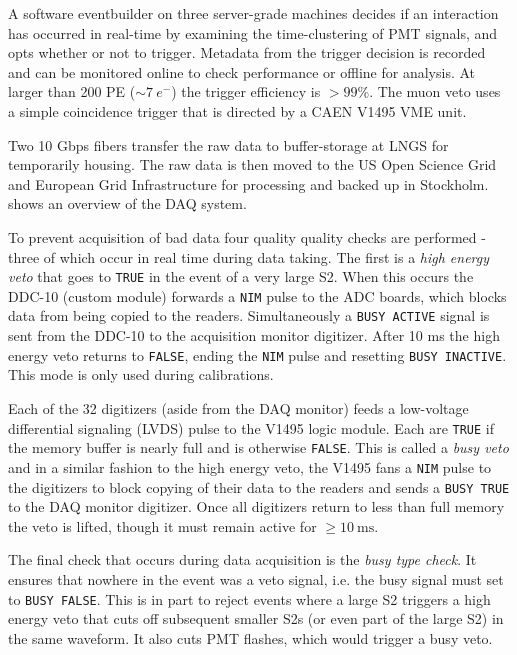 A software eventbuilder on three server-grade machines decides if an interaction has occurred in real-time by examining the
time-clustering of PMT signals, and opts whether or not to trigger.  Metadata from the trigger decision is recorded and can be monitored
online to check performance or offline for analysis.  At larger than 200 PE (${\sim}7\ e^-$) the trigger efficiency is $> 99\%$.  The muon
veto uses a simple coincidence trigger that is directed by a CAEN V1495 VME unit.

Two 10 Gbps fibers transfer the raw data to buffer-storage at LNGS for temporarily housing.  The raw data is then moved to the US Open
Science Grid and European Grid Infrastructure for processing and backed up in Stockholm.   shows an
overview of the DAQ system.

To prevent acquisition of bad data four quality quality checks are performed - three of which occur in real time during data taking.  The
first is a \textit{high energy veto} that goes to \texttt{TRUE} in the event of a very large S2.  When this occurs the DDC-10 (custom
module) forwards a \texttt{NIM} pulse to the ADC boards, which blocks data from being copied to the readers.  Simultaneously a
\texttt{BUSY ACTIVE} signal is sent from the DDC-10 to the
acquisition monitor digitizer.  After 10 ms the high energy veto returns to \texttt{FALSE}, ending the \texttt{NIM} pulse and resetting
\texttt{BUSY INACTIVE}.  This mode is only used during calibrations.

Each of the 32 digitizers (aside from the DAQ monitor) feeds a low-voltage differential signaling (LVDS) pulse to the V1495 logic
module.  Each
are \texttt{TRUE} if the memory buffer is nearly full and is otherwise \texttt{FALSE}.  This is called a \textit{busy veto} and in a
similar fashion to the high energy veto,
the V1495 fans a \texttt{NIM} pulse to the digitizers to block copying of their data to the readers and sends a \texttt{BUSY TRUE} to the
DAQ monitor digitizer.  Once all digitizers return to less than full memory the veto is lifted, though it must remain active for
$\geq 10\ \mathrm{ms}$.

The final check that occurs during data acquisition is the \textit{busy type check}.  It ensures that nowhere in the event was a veto
signal, i.e. the busy signal must set to \texttt{BUSY FALSE}.  This is in part to reject events where a large S2 triggers a high energy
veto that cuts off subsequent smaller S2s (or even part of the large S2) in the same waveform.  It also cuts PMT flashes, which would
trigger a busy veto.

